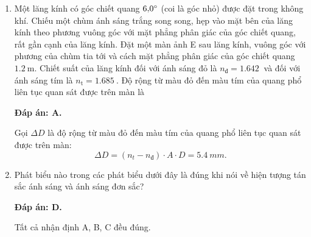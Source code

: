 \begin{enumerate}[label=\bfseries Câu \arabic*:]
{	}
	
	\item {} 
	
	\cauhoi
	{Một lăng kính có góc chiết quang $\SI{6.0}{}^\circ$ (coi là góc nhỏ) được đặt trong không khí. Chiếu một chùm ánh sáng trắng song song, hẹp vào mặt bên của lăng kính theo phương vuông góc với mặt phẳng phân giác của góc chiết quang, rất gần cạnh của lăng kính. Đặt một màn ảnh E sau lăng kính, vuông góc với phương của chùm tia tới và cách mặt phẳng phân giác của góc chiết quang $\SI{1.2}{\meter}$. Chiết suất của lăng kính đối với ánh sáng đỏ là $n_\text{đ}=\SI{1.642}{}$ và đối với ánh sáng tím là $n_\text{t}=\SI{1.685}{}$. Độ rộng từ màu đỏ đến màu tím của quang phổ liên tục quan sát được trên màn là
	}
	
	\loigiai
	{		\textbf{Đáp án: A.}
		
Gọi $ \Delta D $ là độ rộng từ màu đỏ đến màu tím của quang phổ liên tục quan sát được trên màn: 
$$
	\Delta D = (n_{t} - n_{\text{đ}})\cdot A \cdot D = \SI{5,4}{mm}.
$$
		
	}
	
	\item {}
	
	\cauhoi
	{Phát biểu nào trong các phát biểu dưới đây là đúng khi nói về hiện tượng tán sắc ánh sáng và ánh sáng đơn sắc?
	}
	
	\loigiai
	{		\textbf{Đáp án: D.}
		
Tất cả nhận định A, B, C đều đúng.
		
}
\end{enumerate}
